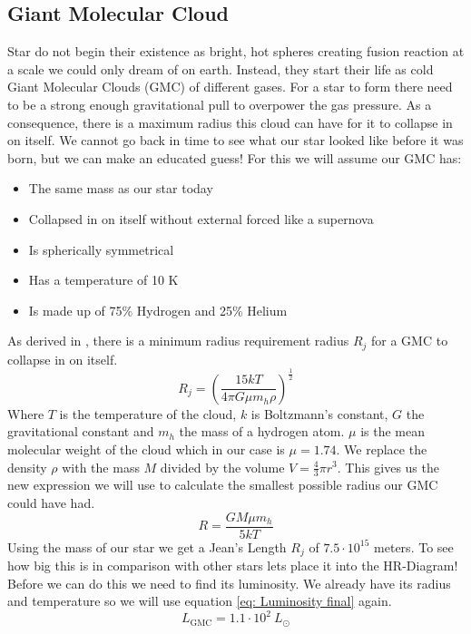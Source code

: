 \documentclass[reprint,english,notitlepage]{revtex4-2}
\begin{document}
\subsection{Giant Molecular Cloud}
Star do not begin their existence as bright, hot spheres creating fusion reaction at a scale we could only dream of on earth. Instead, they start their life as cold Giant Molecular Clouds (GMC) of different gases. For a star to form there need to be a strong enough gravitational pull to overpower the gas pressure. As a consequence, there is a maximum radius this cloud can have for it to collapse in on itself. We cannot go back in time to see what our star looked like before it was born, but we can make an educated guess! For this we will assume our GMC has:
\begin{itemize}
  \item The same mass as our star today
  \item Collapsed in on itself without external forced like a supernova
  \item Is spherically symmetrical
  \item Has a temperature of 10 K
  \item Is made up of 75\% Hydrogen and 25\% Helium
\end{itemize} 
As derived in%
, there is a minimum radius requirement radius $ R_j $ for a GMC to collapse in on itself.
\begin{equation}
  R_j = \left( \frac{15kT }{4 π G μ m_h ρ} \right) ^{\frac{1}{2}}
\end{equation}
Where $ T $ is the temperature of the cloud, $ k $ is Boltzmann's constant, $ G $ the gravitational constant and $ m_h $ the mass of a hydrogen atom. $ μ $ is the mean molecular weight of the cloud which in our case is $ μ = 1.74 $. We replace the density $ ρ $ with the mass $ M $ divided by the volume $ V = \frac{4}{3} π r^{3} $. This gives us the new expression we will use to calculate the smallest possible radius our GMC could have had. 
\begin{equation}\label{eq: Jeans length}
  R = \frac{GMμ m_h }{5kT} 
\end{equation}
Using the mass of our star we get a Jean's Length $ R_j $ of $ 7.5 ⋅ 10^{15} $ meters. To see how big this is in comparison with other stars lets place it into the HR-Diagram! Before we can do this we need to find its luminosity. We already have its radius and temperature so we will use equation \ref{eq: Luminosity final} again. 
\begin{equation}
  L_{\text{GMC}} = 1.1 ⋅ 10^{2}\ L_{⊙}
\end{equation}
\end{document}
